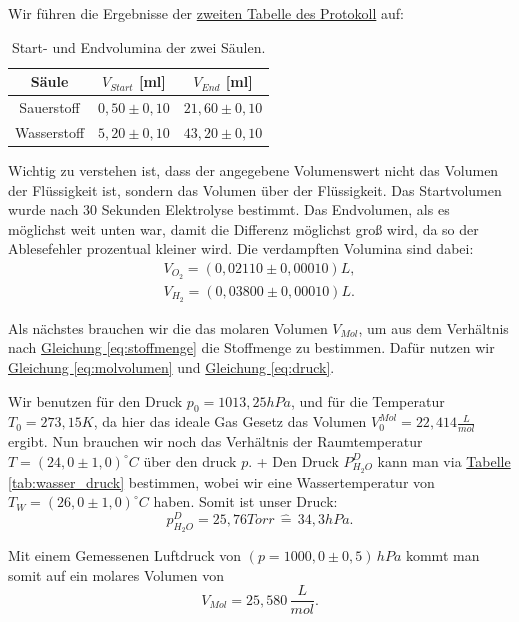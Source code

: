 Wir führen die Ergebnisse der \hyperref[Protokoll]{zweiten Tabelle des Protokoll} auf:
\begin{table}[h!]
    \centering
    \begin{tabular}{c | c | c}
        \toprule
        Säule & $V_{Start}$ [ml] & $V_{End}$ [ml] \\
        \hline
        Sauerstoff & $0,50 \pm 0,10$ & $21,60 \pm 0,10$ \\
        Wasserstoff & $5,20 \pm 0,10$ & $43,20 \pm 0,10$ \\
        \bottomrule
    \end{tabular}
    \caption{Start- und Endvolumina der zwei Säulen.}
\end{table}

Wichtig zu verstehen ist, dass der angegebene Volumenswert nicht das Volumen der Flüssigkeit ist, sondern das Volumen über der Flüssigkeit. 
Das Startvolumen wurde nach 30 Sekunden Elektrolyse bestimmt. Das Endvolumen, als es möglichst weit unten war, damit die Differenz möglichst groß wird, da so der Ablesefehler prozentual kleiner wird.
Die verdampften Volumina sind dabei:
\begin{align}
    V_{O_2} = (0,02110 \pm 0,00010) L, \\
    V_{H_2} = (0,03800 \pm 0,00010) L.
\end{align}

Als nächstes brauchen wir die das molaren Volumen $V_{Mol}$, um aus dem Verhältnis nach \hyperref[eq:stoffmenge]{Gleichung \ref*{eq:stoffmenge}} die Stoffmenge zu bestimmen. 
Dafür nutzen wir \hyperref[eq:molvolumen]{Gleichung \ref*{eq:molvolumen}} und \hyperref[eq:druck]{Gleichung \ref*{eq:druck}}.

Wir benutzen für den Druck $p_0 = 1013,25 hPa$, und für die Temperatur $T_0 = 273,15K$, da hier das ideale Gas Gesetz das Volumen $V_0^{Mol} = 22,414 \frac{L}{mol}$ ergibt.
Nun brauchen wir noch das Verhältnis der Raumtemperatur $T = (24,0 \pm 1,0)^\circ C$ über den druck $p$. 
+
Den Druck $P_{H_2O}^D$ kann man via \hyperref[tab:wasser_druck]{Tabelle \ref*{tab:wasser_druck}} bestimmen, wobei wir eine Wassertemperatur von $T_W = (26,0 \pm 1,0)^\circ C$ haben. Somit ist unser Druck:
\begin{equation}
    p_{H_2O}^D = 25,76 Torr \, \hat= \, 34,3 hPa.
\end{equation}

Mit einem Gemessenen Luftdruck von $(p = 1000,0 \pm 0,5) \, hPa$ kommt man somit auf ein molares Volumen von
\begin{equation}
    V_{Mol} = 25,580  \, \frac{L}{mol}.
\end{equation}

